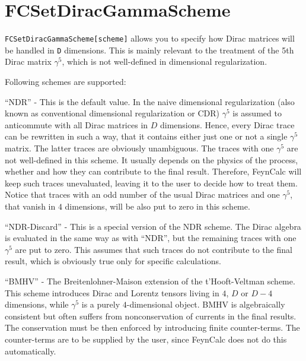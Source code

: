 \documentclass[../FeynCalcManual.tex]{subfiles}
\begin{document}
\hypertarget{fcsetdiracgammascheme}{
\section{FCSetDiracGammaScheme}\label{fcsetdiracgammascheme}}

\texttt{FCSetDiracGammaScheme[\allowbreak{}scheme]} allows you to
specify how Dirac matrices will be handled in \texttt{D} dimensions.
This is mainly relevant to the treatment of the 5th Dirac matrix
\(\gamma^5\), which is not well-defined in dimensional regularization.

Following schemes are supported:

``NDR'' - This is the default value. In the naive dimensional
regularization (also known as conventional dimensional regularization or
CDR) \(\gamma^5\) is assumed to anticommute with all Dirac matrices in
\(D\) dimensions. Hence, every Dirac trace can be rewritten in such a
way, that it contains either just one or not a single \(\gamma^5\)
matrix. The latter traces are obviously unambiguous. The traces with one
\(\gamma^5\) are not well-defined in this scheme. It usually depends on
the physics of the process, whether and how they can contribute to the
final result. Therefore, FeynCalc will keep such traces unevaluated,
leaving it to the user to decide how to treat them. Notice that traces
with an odd number of the usual Dirac matrices and one \(\gamma^5\),
that vanish in \(4\) dimensions, will be also put to zero in this
scheme.

``NDR-Discard'' - This is a special version of the NDR scheme. The Dirac
algebra is evaluated in the same way as with ``NDR'', but the remaining
traces with one \(\gamma^5\) are put to zero. This assumes that such
traces do not contribute to the final result, which is obviously true
only for specific calculations.

``BMHV'' - The Breitenlohner-Maison extension of the t'Hooft-Veltman
scheme. This scheme introduces Dirac and Lorentz tensors living in
\(4\), \(D\) or \(D-4\) dimensions, while \(\gamma^5\) is a purely
\(4\)-dimensional object. BMHV is algebraically consistent but often
suffers from nonconservation of currents in the final results. The
conservation must be then enforced by introducing finite counter-terms.
The counter-terms are to be supplied by the user, since FeynCalc does
not do this automatically.
\end{document}

